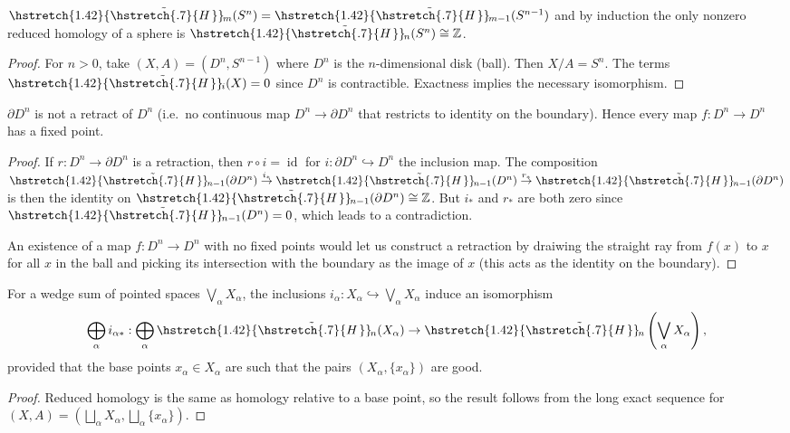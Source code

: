 \documentclass[english,letterpaper]{article}%
\numberwithin{equation}{section}
\numberwithin{figure}{section}
\numberwithin{table}{section}
\theoremstyle{definition}
\theoremstyle{definition}
\theoremstyle{definition}
\theoremstyle{plain}
\theoremstyle{plain}
\theoremstyle{plain}
\theoremstyle{plain}
\theoremstyle{remark}
\theoremstyle{remark}
\newcommand{\bbZ}{\mathbb{Z}}
\DeclareMathOperator{\id}{id}
\newcommand\wt[1]{\hstretch{1.42}{\tilde{\hstretch{.7}{#1\mkern2mu}}}\mkern-2mu}
\begin{document}
\begin{cor}\label{reduced homology of spheres}
    $\wt{H}_m(S^n)=\wt{H}_{m-1}(S^{n-1})$ and by induction the only nonzero reduced homology of a sphere is $\wt{H}_n(S^n)\cong \bbZ$.
\end{cor}
\begin{proof}
     For $n>0$, take $(X,A)=(D^n,S^{n-1})$ where $D^n$ is the $n$-dimensional disk (ball). Then $X/A=S^n$. The terms $\wt{H}_i(X)=0$ since $D^n$ is contractible. Exactness implies the necessary isomorphism.
\end{proof}
\begin{cor}
    $\partial D^n$ is not a retract of $D^n$ (i.e.\ no continuous map $D^n\to \partial D^n$ that restricts to identity on the boundary). Hence every map $f:D^n\to D^n$ has a fixed point.
\end{cor}
\begin{proof}
     If $r:D^n\to \partial D^n$ is a retraction, then $r\circ i=\id$ for $i:\partial D^n\hookrightarrow D^n$ the inclusion map. The composition $\wt{H}_{n-1}(\partial D^n)\overset{i_\ast}\to \wt{H}_{n-1}(D^n)\overset{r_\ast}\to \wt{H}_{n-1}(\partial D^n)$ is then the identity on $\wt{H}_{n-1}(\partial D^n)\cong \bbZ$. But $i_\ast$ and $r_\ast$ are both zero since $\wt{H}_{n-1}(D^n)=0$, which leads to a contradiction.
     
     An existence of a map $f:D^n\to D^n$ with no fixed points would let us construct a retraction by draiwing the straight ray from $f(x)$ to $x$ for all $x$ in the ball and picking its intersection with the boundary as the image of $x$ (this acts as the identity on the boundary).
\end{proof}



\begin{cor}
    For a wedge sum of pointed spaces $\bigvee_{\alpha}X_\alpha$, the inclusions $i_\alpha:X_\alpha\hookrightarrow \bigvee_{\alpha}X_\alpha$ induce an isomorphism 
    \[\bigoplus_\alpha i_{\alpha\ast}:\bigoplus_\alpha\wt{H}_n(X_\alpha)\to \wt{H}_n\left(\bigvee_{\alpha}X_\alpha\right),\]
    provided that the base points $x_\alpha\in X_\alpha$ are such that the pairs $(X_\alpha,\{x_\alpha\})$ are good.
\end{cor}
\begin{proof}
     Reduced homology is the same as homology relative to a base point, so the result follows from the long exact sequence for $(X,A)=\left(\bigsqcup_\alpha X_\alpha, \bigsqcup_\alpha \{x_\alpha\}\right)$.
\end{proof}
\end{document}
